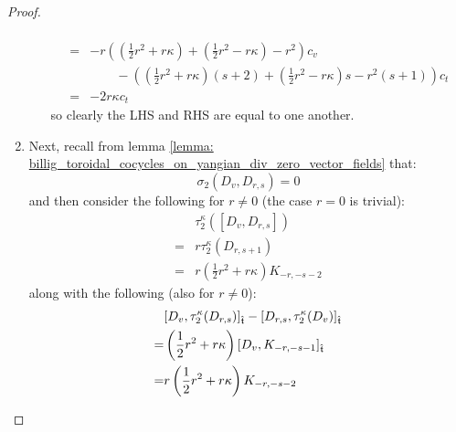 \begin{proof}
\begin{enumerate}
\begin{enumerate}
$$\begin{aligned}
                                    \\
                                    = &
                                        -r \left( \left( \frac12 r^2 + r \kappa \right) + \left( \frac12 r^2 - r \kappa \right) - r^2\right) c_v
                                        \\
                                        & \qquad - \left( \left( \frac12 r^2 + r \kappa \right) (s + 2) + \left( \frac12 r^2 - r \kappa \right) s - r^2 (s + 1) \right) c_t
                                    \\
                                    = & -2r \kappa c_t
                                \end{aligned}
                            $$
                        so clearly the LHS and RHS are equal to one another.
                    \end{enumerate}
                    \item Next, recall from lemma \ref{lemma: billig_toroidal_cocycles_on_yangian_div_zero_vector_fields} that:
                        $$\sigma_2(D_v, D_{r, s}) = 0$$
                    and then consider the following for $r \not = 0$ (the case $r = 0$ is trivial):
                        $$
                            \begin{aligned}
                                & \tau_2^{\kappa}([D_v, D_{r, s}])
                                \\
                                = & r\tau_2^{\kappa}(D_{r, s + 1})
                                \\
                                = & r \left(\frac12 r^2 + r \kappa \right) K_{-r, -s - 2}
                            \end{aligned}
                        $$
                    along with the following (also for $r \not = 0$):
                        $$
                            \begin{aligned}
                                & [D_v, \tau_2^{\kappa}(D_{r, s})]_{\hat{\mathfrak{t}}} - [D_{r, s}, \tau_2^{\kappa}(D_v)]_{\hat{\mathfrak{t}}}
                                \\
                                = & \left(\frac12 r^2 + r \kappa \right)[D_v, K_{-r, -s - 1}]_{\hat{\mathfrak{t}}}
                                \\
                                = & r \left(\frac12 r^2 + r \kappa \right) K_{-r, -s - 2}
                            \end{aligned}
$$
\end{enumerate}
\end{proof}
